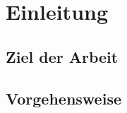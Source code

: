 \chapter{Einleitung}
\label{chap:einleitung}

\section{Ziel der Arbeit}
\label{sec:ziel_der_arbeit}

\section{Vorgehensweise}
\label{sec:vorgehensweise}

